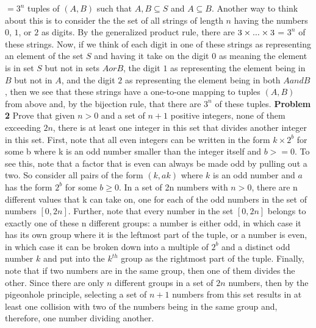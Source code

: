 \documentclass[11pt]{article}
\begin{document}
$ = $$3^n$ tuples of $(A,B)$ such that $A, B \subseteq S$ and $A \subseteq B$.
\newline
\newline
Another way to think about this is to consider the the set of all strings of length $n$ having the numbers $0$, $1$, or $2$ as digits. By the 
generalized product rule, there are $3 \time 3 \times ... \times 3$ = $3^n$ of these strings. Now, if we think of each digit in one of these
strings as representing an element of the set $S$ and having it take on the digit $0$ as meaning the element is in set $S$ but not in
sets $A or B$, the digit $1$ as representing the element being in $B$ but not in $A$, and the digit $2$ as representing the element being
in both $A and B$, then we see that these strings have a one-to-one mapping to tuples $(A, B)$ from above and, by the bijection rule,
that there are $3^n$ of these tuples.
\newline
\textbf{Problem 2}
\newline
Prove that given $n > 0$ and a set of $n+1$ positive integers, none of them exceeding $2n$, there is at least one integer in this set that divides 
another integer in this set.
\newline
\newline
First, note that all even integers can be written in the form $k \times 2^b$ for some b where k is an odd number smaller than the integer itself and $b >= 0$. To see this, note that a factor that is even can always be made odd by pulling out a two. So consider all pairs of the form $(k, ak)$ where $k$ is an odd number and $a$ has the form $2^b$ for some $b \geq 0$. In a set of 2n numbers with $n > 0$, there are
n different values that k can take on, one for each of the odd numbers in the set of numbers $[0,2n]$. Further, note that every number in the set $[0,2n]$ belongs to exactly one of
these n different groups: a number is either odd, in which case it has its own group where it is the leftmost part of the tuple, or a number is even, in which case it can be broken down
into a multiple of $2^b$ and a distinct odd number $k$ and put into the $k^{th}$ group as the rightmost part of the tuple. Finally, note that if two numbers are in the same
group, then one of them divides the other. Since there are only $n$ different groups in a set of $2n$ numbers, then by the pigeonhole principle, selecting a set of $n+1$ numbers from
this set results in at least one collision with two of the numbers being in the same group and, therefore, one number dividing another. 
\newline
$$
\end{document}
